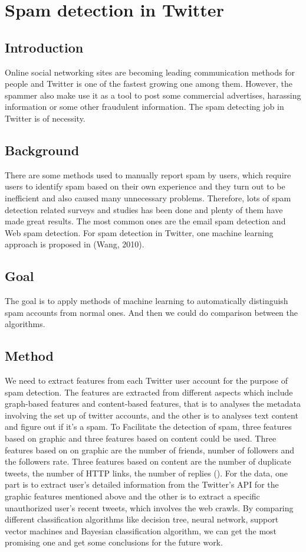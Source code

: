 \documentclass[../proposal.tex]{subfiles}
\begin{document}
\section{Spam detection in Twitter}

\subsection{Introduction}
Online social networking sites are becoming leading communication methods for
people and Twitter is one of the fastest growing one among them. However, the
spammer also make use it as a tool to post some commercial advertises,
harassing information or some other fraudulent information. The spam detecting
job in Twitter is of necessity.

\subsection{Background}
There are some methods used to manually report spam by users, which require
users to identify spam based on their own experience and they turn out to be
inefficient and also caused many unnecessary problems. Therefore, lots of spam
detection related surveys and studies has been done and plenty of them have
made great results. The most common ones are the email spam detection and Web
spam detection. For spam detection in Twitter, one machine learning approach is
proposed in (Wang, 2010).

\subsection{Goal}
The goal is to apply methods of machine learning to automatically distinguish
spam accounts from normal ones. And then we could do comparison between the
algorithms.

\subsection{Method}
We need to extract features from each Twitter user account for the purpose of
spam detection. The features are extracted from different aspects which include
graph-based features and content-based features, that is to analyses the
metadata involving the set up of twitter accounts, and the other is to analyses
text content and figure out if it’s a spam. To Facilitate the detection of
spam,  three features based on graphic and three features based on content
could be used. Three features based on on graphic are the number of friends,
number of followers and the followers rate. Three features based on content are
the number of duplicate tweets, the number of HTTP links, the number of
replies (\cite{wang2010don}). For the data, one part is to extract user's
detailed information from the Twitter's API for the graphic features mentioned
above and the other is to extract a specific unauthorized user's recent tweets,
which involves the web crawls. By comparing different classification algorithms
like decision tree, neural network, support vector machines and Bayesian
classification algorithm, we can get the most promising one and get some
conclusions for the future work.
\end{document}
